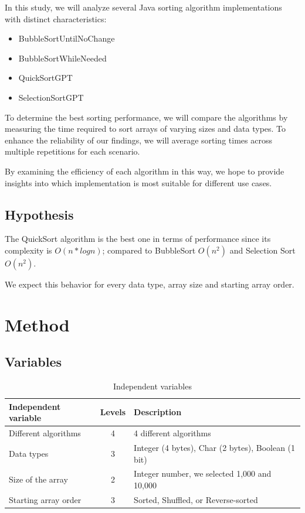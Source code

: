 \documentclass{article}
\begin{document}
    In this study, we will analyze several Java sorting algorithm implementations with distinct characteristics: 
    \begin{itemize}
        \item BubbleSortUntilNoChange
        \item BubbleSortWhileNeeded
        \item QuickSortGPT
        \item SelectionSortGPT
    \end{itemize}
    
    To determine the best sorting performance, we will compare the algorithms by measuring the time required to sort arrays of varying sizes and data types. To enhance the reliability of our findings, we will average sorting times across multiple repetitions for each scenario.
    
    By examining the efficiency of each algorithm in this way, we hope to provide insights into which implementation is most suitable for different use cases.
    
    \subsection*{Hypothesis}
    The QuickSort algorithm is the best one in terms of performance since its complexity is $O(n*logn)$; compared to BubbleSort $O(n^2)$ and Selection Sort $O(n^2)$. 
    
    We expect this behavior for every data type, array size and starting array order.

\newpage
    
\section{Method}
    \subsection{Variables}
    \begin{table}[h!]
        \centering
        \begin{tabular}{l|c|l}
            \textbf{Independent variable} & \textbf{Levels} & \textbf{Description} \\ \hline
            Different algorithms & 4 & 4 different algorithms \\ 
            Data types & 3 & Integer (4 bytes), Char (2 bytes), Boolean (1 bit) \\ 
            Size of the array & 2 & Integer number, we selected 1,000 and 10,000 \\ 
            Starting array order & 3 & Sorted, Shuffled, or Reverse-sorted \\
        \end{tabular}
        \caption{Independent variables}
    \end{table}
\end{document}
